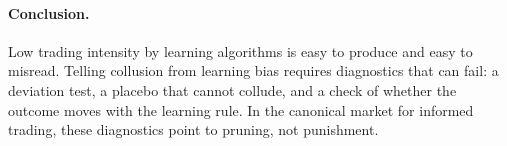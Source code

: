 \paragraph{Conclusion.} Low trading intensity by learning algorithms is
easy to produce and easy to misread. Telling collusion from learning bias
requires diagnostics that can fail: a deviation test, a placebo that cannot
collude, and a check of whether the outcome moves with the learning rule. In
the canonical market for informed trading, these diagnostics point to pruning,
not punishment.
